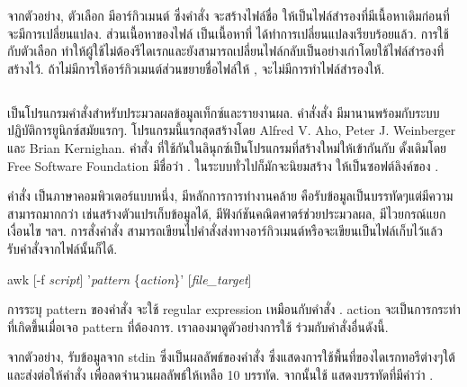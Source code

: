 \begin{thwbr}
จากตัวอย่าง, ตัวเลือก  มีอาร์กิวเมนต์  ซึ่งคำสั่ง  จะสร้างไฟล์ชื่อ  ให้เป็นไฟล์สำรองที่มีเนื้อหาเดิมก่อนที่จะมีการเปลี่ยนแปลง. ส่วนเนื้อหาของไฟล์  เป็นเนื้อหาที่  ได้ทำการเปลี่ยนแปลงเรียบร้อยแล้ว. การใช้  กับตัวเลือก  ทำให้ผู้ใช้ไม่ต้องรีไดเรกและยังสามารถเปลี่ยนไฟล์กลับเป็นอย่างเก่าโดยใช้ไฟล์สำรองที่สร้างไว้. ถ้าไม่มีการให้อาร์กิวเมนต์ส่วนขยายชื่อไฟล์ให้ , จะไม่มีการทำไฟล์สำรองให้.


\subsection{}
 เป็นโปรแกรมคำสั่งสำหรับประมวลผลข้อมูลเท็กซ์และรายงานผล. คำสั่งสั่ง  มีมานานพร้อมกับระบบปฏิบัติการยูนิกซ์สมัยแรกๆ. โปรแกรมนี้แรกสุดสร้างโดย Alfred V. Aho, Peter J. Weinberger และ Brian Kernighan. คำสั่ง  ที่ใช้กันในลินุกซ์เป็นโปรแกรมที่สร้างใหม่ให้เข้ากันกับ  ดั้งเดิมโดย Free Software Foundation มีชื่อว่า . ในระบบทั่วไปก็มักจะนิยมสร้าง  ให้เป็นซอฟต์ลิงค์ของ .

คำสั่ง  เป็นภาษาคอมพิวเตอร์แบบหนึ่ง, มีหลักการการทำงานคล้าย  คือรับข้อมูลเป็นบรรทัดๆแต่มีความสามารถมากกว่า  เช่นสร้างตัวแปรเก็บข้อมูลได้, มีฟังก์ชันคณิตศาตร์ช่วยประมวลผล, มีไวยกรณ์แยกเงื่อนไข ฯลฯ. การสั่งคำสั่ง  สามารถเขียนไปคำสั่งส่งทางอาร์กิวเมนต์หรือจะเขียนเป็นไฟล์เก็บไว้แล้วรับคำสั่งจากไฟล์นั้นก็ได้.

\begin{MyVerbatim}
awk [-f \textit{script}] '\textit{pattern} \{\textit{action}\}' [\textit{file_target}]
\end{MyVerbatim}

การระบุ pattern ของคำสั่ง  จะใช้ regular expression เหมือนกับคำสั่ง . action จะเป็นการกระทำที่เกิดขึ้นเมื่อเจอ pattern ที่ต้องการ. เราลองมาดูตัวอย่างการใช้  ร่วมกับคำสั่งอื่นดังนี้.
\begin{MyExample}\label{ex:basic_awk}
\end{MyExample}
จากตัวอย่าง,  รับข้อมูลจาก stdin ซึ่งเป็นผลลัพธ์ของคำสั่ง  ซึ่งแสดงการใช้พื้นที่ของไดเรกทอรีต่างๆใต้  และส่งต่อให้คำสั่ง  เพื่อลดจำนวนผลลัพธ์ให้เหลือ 10 บรรทัด. จากนั้นใช้  แสดงบรรทัดที่มีคำว่า . 


\end{thwbr}
